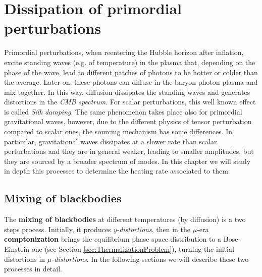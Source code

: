\chapter{Dissipation of primordial perturbations}\label{chap:dissipation}
\label{sec:dissipation_PGW}
Primordial perturbations, when reentering the Hubble horizon after inflation, excite standing waves (e.g. of temperature) in the plasma that, depending on the phase of the wave, lead to different patches of photons to be hotter or colder than the average. Later on, these photons can diffuse in the baryon-photon plasma and mix together. In this way, diffusion dissipates the standing waves and generates distortions in the \emph{CMB spectrum}. For scalar perturbations, this well known effect is called \emph{Silk damping}. The same phenomenon takes place also for primordial gravitational waves, however, due to the different physics of tensor perturbation compared to scalar ones, the sourcing mechanism has some differences. In particular, gravitational waves dissipates at a slower rate than scalar perturbations and they are in general weaker, leading to smaller amplitudes, but they are sourced by a broader spectrum of modes. In this chapter we will study in depth this processes to determine the heating rate associated to them.

\section{Mixing of blackbodies}\label{sec:MixingOfBlackbodies}
The \textbf{mixing of blackbodies} at different temperatures (by diffusion) is a two steps process.
Initially, it produces \emph{y-distortions}, then in the $\mu$-era \textbf{comptonization} brings the equilibrium phase space distribution to a Bose-Einstein one (see Section \ref{sec:ThermalizationProblem}), turning the initial distortions in \emph{$\mu$-distortions}. In the following sections we will describe these two processes in detail.

